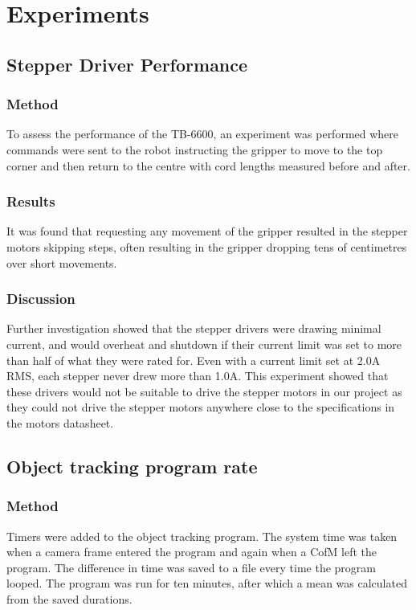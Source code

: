 \documentclass[conference]{IEEEtran}
\begin{document}
\section{Experiments}\label{experiments}
\subsection{Stepper Driver Performance}\label{stepperReliability}
\subsubsection{Method}
To assess the performance of the TB-6600, an experiment was performed where commands were sent to the robot instructing the gripper to move to the top corner and then return to the centre with cord lengths measured before and after. 
\subsubsection{Results}
It was found that requesting any movement of the gripper resulted in the stepper motors skipping steps, often resulting in the gripper dropping tens of centimetres over short movements. 
\subsubsection{Discussion}
Further investigation showed that the stepper drivers were drawing minimal current, and would overheat and shutdown if their current limit was set to more than half of what they were rated for. Even with a current limit set at 2.0A RMS, each stepper never drew more than 1.0A. This experiment showed that these drivers would not be suitable to drive the stepper motors in our project as they could not drive the stepper motors anywhere close to the specifications in the motors datasheet.


\subsection{Object tracking program rate}
\subsubsection{Method}
Timers were added to the object tracking program. The system time was taken when a camera frame entered the program and again when a CofM left the program. The difference in time was saved to a file every time the program looped. The program was run for ten minutes, after which a mean was calculated from the saved durations.
\end{document}
